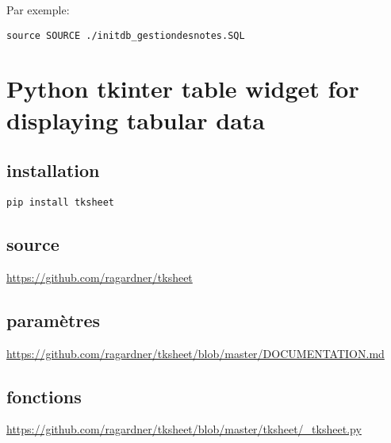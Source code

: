 \documentclass[11pt]{article}
\begin{document}
Par exemple:

\begin{verbatim}
source SOURCE ./initdb_gestiondesnotes.SQL
\end{verbatim}


\section{Python tkinter table widget for displaying tabular data}
\label{sec:org56bfc8c}

\subsection{installation}
\label{sec:org6b042e2}
\begin{verbatim}
pip install tksheet
\end{verbatim}

\subsection{source}
\label{sec:org3c381fd}
\url{https://github.com/ragardner/tksheet}

\subsection{paramètres}
\label{sec:orgfd77081}
\url{https://github.com/ragardner/tksheet/blob/master/DOCUMENTATION.md}

\subsection{fonctions}
\label{sec:orge00e4e5}
\url{https://github.com/ragardner/tksheet/blob/master/tksheet/\_tksheet.py}
\end{document}
